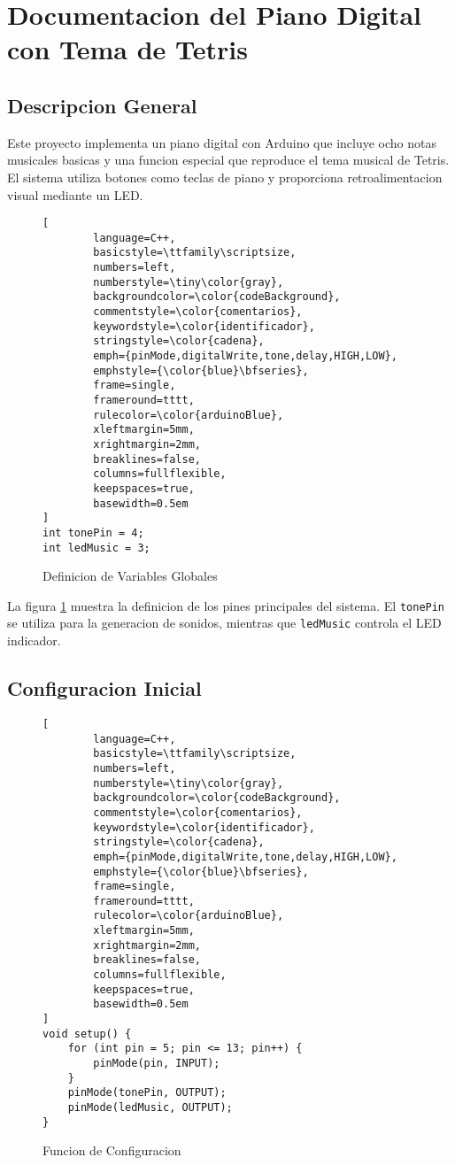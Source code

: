 \section{Documentacion del Piano Digital con Tema de Tetris}

\subsection{Descripcion General}
Este proyecto implementa un piano digital con Arduino que incluye ocho notas musicales basicas y una funcion especial que reproduce el tema musical de Tetris. El sistema utiliza botones como teclas de piano y proporciona retroalimentacion visual mediante un LED.

\begin{figure}[H]
	\centering
	\begin{lstlisting}[
		language=C++,
		basicstyle=\ttfamily\scriptsize,
		numbers=left,
		numberstyle=\tiny\color{gray},
		backgroundcolor=\color{codeBackground},
		commentstyle=\color{comentarios},
		keywordstyle=\color{identificador},
		stringstyle=\color{cadena},
		emph={pinMode,digitalWrite,tone,delay,HIGH,LOW},
		emphstyle={\color{blue}\bfseries},
		frame=single,
		frameround=tttt,
		rulecolor=\color{arduinoBlue},
		xleftmargin=5mm,
		xrightmargin=2mm,
		breaklines=false,
		columns=fullflexible,
		keepspaces=true,
		basewidth=0.5em 
]
int tonePin = 4;    
int ledMusic = 3;   
	\end{lstlisting}
	\caption{Definicion de Variables Globales}
	\label{fig:variables-globales}
\end{figure}

La figura \ref{fig:variables-globales} muestra la definicion de los pines principales del sistema. El \texttt{tonePin} se utiliza para la generacion de sonidos, mientras que \texttt{ledMusic} controla el LED indicador.

\subsection{Configuracion Inicial}
\begin{figure}[H]
	\centering
	\begin{lstlisting}[
		language=C++,
		basicstyle=\ttfamily\scriptsize,
		numbers=left,
		numberstyle=\tiny\color{gray},
		backgroundcolor=\color{codeBackground},
		commentstyle=\color{comentarios},
		keywordstyle=\color{identificador},
		stringstyle=\color{cadena},
		emph={pinMode,digitalWrite,tone,delay,HIGH,LOW},
		emphstyle={\color{blue}\bfseries},
		frame=single,
		frameround=tttt,
		rulecolor=\color{arduinoBlue},
		xleftmargin=5mm,
		xrightmargin=2mm,
		breaklines=false,
		columns=fullflexible,
		keepspaces=true,
		basewidth=0.5em 
]
void setup() {
	for (int pin = 5; pin <= 13; pin++) {
		pinMode(pin, INPUT);    
	}
	pinMode(tonePin, OUTPUT);   
	pinMode(ledMusic, OUTPUT);  
}
	\end{lstlisting}
	\caption{Funcion de Configuracion}
	\label{fig:setup-function}
\end{figure}

